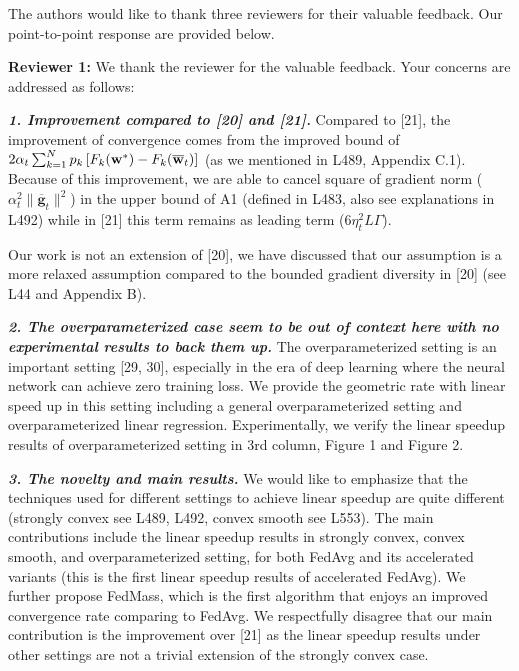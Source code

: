 \documentclass{article}
\newcommand{\ov}[1]{{\overline{\mathbf{#1}}}}
\begin{document}
The authors would like to thank three reviewers for their valuable feedback. 
Our point-to-point response are provided below.

% 

{\color{blue}\textbf{Reviewer 1:}} We thank the reviewer for the valuable feedback. Your concerns are addressed as follows: 

\textbf{\textit{1. Improvement compared to [20] and [21].}} Compared to [21], the improvement 
of convergence comes from the improved bound of $2\alpha_{t}\sum_{k=1}^{N}p_{k}\left[F_{k}(\vw^{\ast})-F_{k}(\ov{w}_{t})\right]$ (as we mentioned in L489, Appendix C.1). Because of this improvement, we are able to cancel square of gradient norm ($\alpha_{t}^{2}\|\ov{g}_{t}\|^{2}$) in the upper bound of A1 (defined in L483, also see explanations in L492) while in [21] this term remains as leading term ($6\eta_t^2L \Gamma$). 

Our work is not an extension of [20], we have discussed that our assumption is
a more relaxed assumption compared to the bounded gradient diversity in [20] (see L44 and Appendix B). 

\textbf{\textit{2. The overparameterized case seem to be out of context here with no experimental results to back them up.}} The overparameterized 
setting is an important setting [29, 30], especially in the era of deep learning
where the neural network can achieve zero training loss. We provide the 
geometric rate with linear speed up in this setting including a general overparameterized setting and overparameterized linear regression. 
Experimentally, we verify the linear speedup results of overparameterized setting in 3rd column, Figure 1 and Figure 2. 

\textbf{\textit{3. The novelty and main results.}}
We would like to emphasize that the techniques used for different settings
to achieve linear speedup are quite different (strongly convex see L489, L492, convex smooth see L553). The main contributions include
the linear speedup results in strongly convex, convex smooth, and overparameterized
setting, for both FedAvg and its accelerated variants (this is the first linear speedup results of accelerated FedAvg). We further propose FedMass,
which is the first algorithm that enjoys an improved convergence rate comparing to
FedAvg. We respectfully disagree that our main contribution is the improvement over [21] as the linear speedup results under other settings are not a trivial extension of the strongly convex case.
\end{document}
